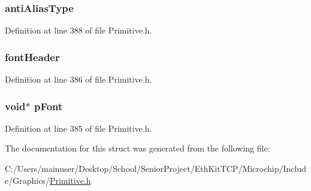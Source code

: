 \subsubsection[{anti\+Alias\+Type}]{ anti\+Alias\+Type}\label{struct_g_f_x___f_o_n_t___c_u_r_r_e_n_t_ade821424697142b662b3130653b64f70}


Definition at line 388 of file Primitive.\+h.

\hypertarget{struct_g_f_x___f_o_n_t___c_u_r_r_e_n_t_a8c0a3bdd37d2f1812be75475c6226aac}{}
\subsubsection[{font\+Header}]{ font\+Header}\label{struct_g_f_x___f_o_n_t___c_u_r_r_e_n_t_a8c0a3bdd37d2f1812be75475c6226aac}


Definition at line 386 of file Primitive.\+h.

\hypertarget{struct_g_f_x___f_o_n_t___c_u_r_r_e_n_t_a4a1009bfded2760eeec21b35ed171151}{}
\subsubsection[{p\+Font}]{\setlength{\rightskip}{0pt plus 5cm}void$\ast$ p\+Font}\label{struct_g_f_x___f_o_n_t___c_u_r_r_e_n_t_a4a1009bfded2760eeec21b35ed171151}


Definition at line 385 of file Primitive.\+h.



The documentation for this struct was generated from the following file\+:\begin{DoxyCompactItemize}
\item 
C\+:/\+Users/mainuser/\+Desktop/\+School/\+Senior\+Project/\+Eth\+Kit\+T\+C\+P/\+Microchip/\+Include/\+Graphics/\hyperlink{_primitive_8h}{Primitive.\+h}\end{DoxyCompactItemize}
